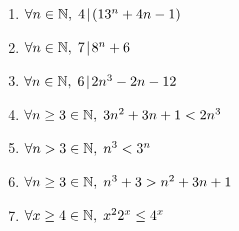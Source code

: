 \begin{enumerate}
{\begin{proof}
\begin{gather*}
(k+1)^{5} - 5(k+1)^3 + 14k \\
= \; k^5 + 5k^4 + 10k^3 + 10k^2 + 5k + 1 - 5(k^3 + 3k^2 + 3k + 1) + 14(k+1) \\
= \; (k^5 - 5k^3 +14k) + (5k^4 + 10k^3 + 10k^2 + 5k + 1 - 5(3k^2  + 3k + 1) + 14 \\
= \; (k^5 - 5k^3 +14k) + (5k^4 + 10k^3  - 5k^2 - 10k + 10) \\
=\;  (k^5 - 5k^3 +14k) + 5(k^4 + 2k^3 - k^2 - 2k + 2)
\end{gather*}

Since $k^4 + 2k^3 - k^2 - 2k + 2$ is clearly an integer, and the inductive hypothesis tells us that $k^5 - 5k^3 +14k$ is a multiple of $5$, it follows that 
$(k+1)^{5} - 5(k+1)^3 + 14k$  is a multiple of $5$ and so the inductive step is proved.  
\end{proof}
}

\item $\forall n \in {\mathbb N}, \; 4 \!\mid\! (13^{n}+4n-1)$

\wbvfill


\item $\forall n \in {\mathbb N}, \; 7 \!\mid\! 8^n+6$

\wbvfill

\workbookpagebreak

\item $\forall n \in {\mathbb N}, \; 6 \!\mid\! 2n^3 - 2n - 12$

\wbvfill


\item $\forall n \geq 3 \in {\mathbb N}, \; 3n^2+3n+1 < 2n^3$

\wbvfill

\workbookpagebreak

\item $\forall n > 3 \in {\mathbb N}, \; n^3 < 3^n$

\wbvfill


\item $\forall n \geq 3 \in {\mathbb N}, \; n^{3}+3>n^{2}+3n+1$

\wbvfill

\workbookpagebreak

\item $\forall x \geq 4 \in {\mathbb N}, \; x^22^x \leq 4^x$

\wbvfill


\end{enumerate}




